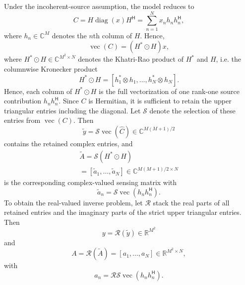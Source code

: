 \documentclass[peer-review]{fa2026}
\begin{document}
Under the incoherent-source assumption, the model reduces to
\begin{equation}
    C = H \operatorname{diag}(x) H^\mathsf{H}
    = \sum_{n=1}^{N} x_n h_n h_n^\mathsf{H} ,
\end{equation}
where $h_n \in \mathbb{C}^{M}$ denotes the $n$th column of $H$. Hence,
\begin{equation}
    \operatorname{vec}(C) = (H^* \odot H)x ,
\end{equation}
where $H^* \odot H \in \mathbb{C}^{M^2 \times N}$ denotes the Khatri-Rao product of $H^*$ and $H$, i.e. the columnwise Kronecker product
\begin{equation}
    H^* \odot H = [h_1^* \otimes h_1,\dots,h_N^* \otimes h_N] .
\end{equation}
Hence, each column of $H^* \odot H$ is the full vectorization of one rank-one source contribution $h_n h_n^\mathsf{H}$. Since $C$ is Hermitian, it is sufficient to retain the upper triangular entries including the diagonal. Let $\mathcal{S}$ denote the selection of these entries from $\operatorname{vec}(C)$. Then
\begin{equation}
    \tilde{y} = \mathcal{S}\operatorname{vec}(\hat{C}) \in \mathbb{C}^{M(M+1)/2}
\end{equation}
contains the retained complex entries, and
\begin{multline}
    \tilde{A} = \mathcal{S}(H^* \odot H) \\
    = [\tilde{a}_1,\dots,\tilde{a}_N] \in \mathbb{C}^{M(M+1)/2 \times N}
\end{multline}
is the corresponding complex-valued sensing matrix with
\begin{equation}
    \tilde{a}_n = \mathcal{S}\operatorname{vec}(h_n h_n^\mathsf{H}) .
\end{equation}
To obtain the real-valued inverse problem, let $\mathcal{R}$ stack the real parts of all retained entries and the imaginary parts of the strict upper triangular entries. Then
\begin{equation}
    y = \mathcal{R}(\tilde{y}) \in \mathbb{R}^{M^2}
\end{equation}
and
\begin{equation}
    A = \mathcal{R}(\tilde{A})
    = [a_1,\dots,a_N] \in \mathbb{R}^{M^2 \times N},
\end{equation}
with
\begin{equation}
    a_n = \mathcal{R}\mathcal{S}\operatorname{vec}(h_n h_n^\mathsf{H}) .
\end{equation}
\end{document}
